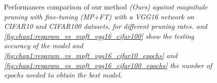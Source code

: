 \begin{figure}

    
  \caption{ Performances comparison of our method \em{(Ours)} against
  magnitude pruning with fine-tuning \em{(MP+FT)} with a VGG16 network on
  CIFAR10 and CIFAR100 datasets, for different pruning rates.
   and
  \cref{fig:chap1:reparam_vs_mpft_vgg16_cifar100} show the testing accuracy of
  the model and \cref{fig:chap1:reparam_vs_mpft_vgg16_cifar10_epochs} and
  \cref{fig:chap1:reparam_vs_mpft_vgg16_cifar100_epochs} the
  number of epochs needed to obtain the best model.}
  \label{fig:chap1:reparam_vs_mpft_vgg16}
\end{figure}

